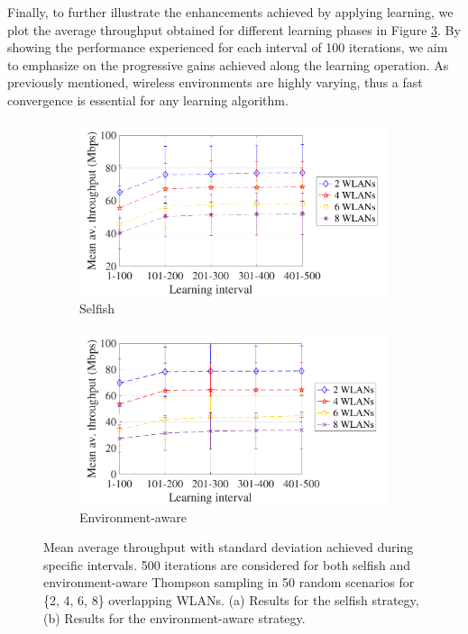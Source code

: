 \documentclass[preprint,12pt]{elsarticle}
\begin{document}
Finally, to further illustrate the enhancements achieved by applying learning, we plot the average throughput obtained for different learning phases in Figure \ref{fig:cumulative_tpt}. By showing the performance experienced for each interval of 100 iterations, we aim to emphasize on the progressive gains achieved along the learning operation. As previously mentioned, wireless environments are highly varying, thus a fast convergence is essential for any learning algorithm.

\begin{figure}[h!]
	\centering
	\begin{subfigure}[b]{0.4\textwidth}
		\includegraphics[width=\textwidth]{scalability_selfish_learning_iterations}
		\caption{Selfish}
		\label{fig:scalability_selfish_accumulated}
	\end{subfigure}
	\begin{subfigure}[b]{0.4\textwidth}
		\includegraphics[width=\textwidth]{scalability_informed_learning_iterations}
		\caption{Environment-aware}
		\label{fig:scalability_informed_accumulated}
	\end{subfigure}
	\caption{Mean average throughput with standard deviation achieved during specific intervals. 500 iterations are considered for both selfish and environment-aware Thompson sampling in 50 random scenarios for \{2, 4, 6, 8\} overlapping WLANs. (a) Results for the selfish strategy, (b) Results for the environment-aware strategy.}
	\label{fig:cumulative_tpt}
\end{figure}
\end{document}
